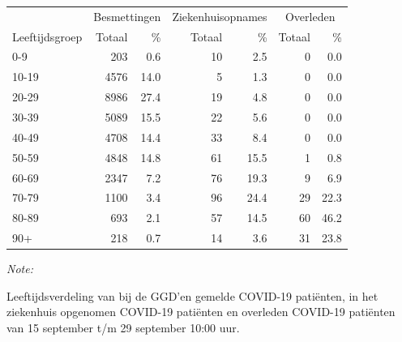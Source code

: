 \documentclass[
  english,
  man,floatsintext]{apa6}
\begin{document}
\begin{table}[H]
\centering\begingroup\fontsize{11}{13}\selectfont

\begin{threeparttable}
\begin{tabular}{lrrrrrr}
\toprule
\multicolumn{1}{c}{ } & \multicolumn{2}{c}{Besmettingen} & \multicolumn{2}{c}{Ziekenhuisopnames} & \multicolumn{2}{c}{Overleden} \\
\cmidrule(l{3pt}r{3pt}){2-3} \cmidrule(l{3pt}r{3pt}){4-5} \cmidrule(l{3pt}r{3pt}){6-7}
Leeftijdsgroep & Totaal & \% & Totaal & \% & Totaal & \%\\
\midrule
0-9 & 203 & 0.6 & 10 & 2.5 & 0 & 0.0\\
10-19 & 4576 & 14.0 & 5 & 1.3 & 0 & 0.0\\
20-29 & 8986 & 27.4 & 19 & 4.8 & 0 & 0.0\\
30-39 & 5089 & 15.5 & 22 & 5.6 & 0 & 0.0\\
40-49 & 4708 & 14.4 & 33 & 8.4 & 0 & 0.0\\
50-59 & 4848 & 14.8 & 61 & 15.5 & 1 & 0.8\\
60-69 & 2347 & 7.2 & 76 & 19.3 & 9 & 6.9\\
70-79 & 1100 & 3.4 & 96 & 24.4 & 29 & 22.3\\
80-89 & 693 & 2.1 & 57 & 14.5 & 60 & 46.2\\
90+ & 218 & 0.7 & 14 & 3.6 & 31 & 23.8\\
\bottomrule
\end{tabular}
\begin{tablenotes}
\item \textit{Note: } 
\item Leeftijdsverdeling van bij de GGD’en gemelde COVID-19 patiënten, in het ziekenhuis opgenomen COVID-19 patiënten en overleden COVID-19 patiënten van 15 september t/m 29 september 10:00 uur.
\end{tablenotes}
\end{threeparttable}
\endgroup{}
\end{table}
\end{document}
